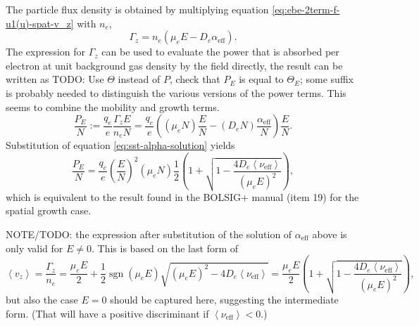 \documentclass{book}
\newcommand{\MEAN}[1]{\ensuremath{\!\left\langle{{#1}}\right\rangle}}
\DeclareMathOperator{\sgn}{sgn}
\begin{document}
The particle flux density is obtained by multiplying equation \eqref{eq:ebe-2term-f-u1(u)-spat-v_z}
with $n_e$,
\begin{equation}
	\Gamma_z = n_e(\mu_e E - D_e\alpha_{\text{eff}}).
\end{equation}
The expression for $\Gamma_z$ can be used to evaluate the power that is absorbed per electron
at unit background gas density by the field directly, the result can be written as
TODO: Use $\Theta$ instead of $P$, check that $P_E$ is equal to $\Theta_E$; some suffix is
probably needed to distinguish the various versions of the power terms. This seems to
combine the mobility and growth terms.
\begin{equation}
	\frac{P_E}{N} := \frac{q_e}{e}\frac{\Gamma_zE}{n_eN} = \frac{q_e}{e}\left((\mu_eN) \frac{E}{N} - (D_eN)\frac{\alpha_{\text{eff}}}{N}\right)\frac{E}{N}.
\end{equation}
Substitution of equation \eqref{eq:sst-alpha-solution} yields
\begin{equation}
	\frac{P_E}{N} = \frac{q_e}{e}\left(\frac{E}{N}\right)^2(\mu_eN)\frac{1}{2}\left(1 +\sqrt{1-\frac{4D_e\MEAN{\nu_{\text{eff}}}}{(\mu_eE)^2}}\right),
\end{equation}
which is equivalent to the result found in the BOLSIG+ manual \cite[p. 18]{BolsigManual2016}
(item 19) for the spatial growth case.
\begin{framed}
NOTE/TODO: the expression after substitution of the solution of $\alpha_{\text{eff}}$ above is
only valid for $E\neq 0$. This is based on the last form of
\begin{equation}
	\MEAN{v_z}
	=\frac{\Gamma_z}{n_e}
	= \frac{\mu_e E}{2} +\frac{1}{2}\sgn(\mu_eE)\sqrt{(\mu_eE)^2-4D_e\MEAN{\nu_{\text{eff}}}}
	= \frac{\mu_e E}{2}\left(1 +\sqrt{1-\frac{4D_e\MEAN{\nu_{\text{eff}}}}{(\mu_eE)^2}}\right),
\end{equation}
but also the case $E=0$ should be captured here, suggesting the intermediate form. (That will have
a positive discriminant if $\MEAN{\nu_{\text{eff}}}<0$.)
\end{framed}
\end{document}
